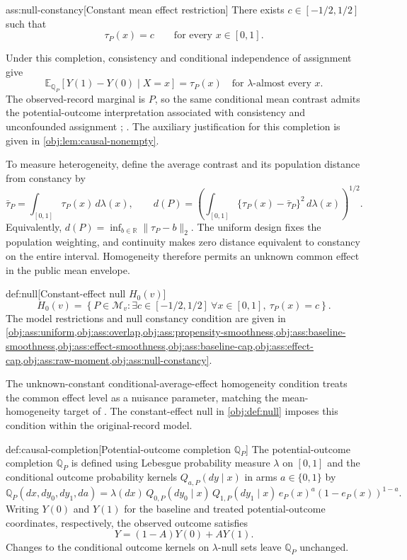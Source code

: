 \documentclass[11pt]{article}
\begin{document}
\begin{assumptionv}{ass:null-constancy}[Constant mean effect restriction]
There exists \(c\in[-1/2,1/2]\) such that
\[
\tau_P(x)=c
\qquad\text{for every }x\in[0,1].
\]
\end{assumptionv}

Under this completion, consistency and conditional independence of assignment give
\[
\mathbb E_{\mathbb Q_P}[Y(1)-Y(0)\mid X=x]=\tau_P(x)
\quad\text{for }\lambda\text{-almost every }x.
\]
The observed-record marginal is \(P\), so the same conditional mean contrast admits the potential-outcome interpretation associated with consistency and unconfounded assignment \citep[Section 3]{Rubin1974}; \citep[Section 2]{Rosenbaum1983}. The auxiliary justification for this completion is given in \cref{obj:lem:causal-nonempty}.

To measure heterogeneity, define the average contrast  and its population distance from constancy  by
\[
\bar\tau_P=\int_{[0,1]}\tau_P(x)\,d\lambda(x),
\qquad
d(P)
=
\left(
\int_{[0,1]}\{\tau_P(x)-\bar\tau_P\}^{2}\,d\lambda(x)
\right)^{1/2}.
\]
Equivalently, \(d(P)=\inf_{b\in\mathbb R}\|\tau_P-b\|_2\). The uniform design fixes the population weighting, and continuity makes zero distance equivalent to constancy on the entire interval. Homogeneity therefore permits an unknown common effect  in the public mean envelope.

\begin{definitionv}{def:null}[Constant-effect null $H_0(v)$]
\[
H_0(v)
=
\left\{
P\in\mathcal M_v:
\exists c\in[-1/2,1/2]\ 
\forall x\in[0,1],\ \tau_P(x)=c
\right\}.
\]
The model restrictions and null constancy condition are given in \cref{obj:ass:uniform,obj:ass:overlap,obj:ass:propensity-smoothness,obj:ass:baseline-smoothness,obj:ass:effect-smoothness,obj:ass:baseline-cap,obj:ass:effect-cap,obj:ass:raw-moment,obj:ass:null-constancy}.
\end{definitionv}

The unknown-constant conditional-average-effect homogeneity condition treats the common effect level as a nuisance parameter, matching the mean-homogeneity target of \citep{CrumpHotzImbensMitnik2008Homogeneity}. The constant-effect null  in \cref{obj:def:null} imposes this condition within the original-record model.

\begin{definitionv}{def:causal-completion}[Potential-outcome completion $\mathbb Q_P$]
The potential-outcome completion \(\mathbb Q_P\) is defined using Lebesgue probability measure \(\lambda\) on \([0,1]\) and the conditional outcome probability kernels \(Q_{a,P}(dy\mid x)\) in arms \(a\in\{0,1\}\) by
\[
\mathbb Q_P(dx,dy_0,dy_1,da)
=
\lambda(dx)\,Q_{0,P}(dy_0\mid x)\,Q_{1,P}(dy_1\mid x)\,
e_P(x)^a(1-e_P(x))^{1-a}.
\]
Writing \(Y(0)\) and \(Y(1)\) for the baseline and treated potential-outcome coordinates, respectively, the observed outcome satisfies
\[
Y=(1-A)Y(0)+AY(1).
\]
Changes to the conditional outcome kernels on \(\lambda\)-null sets leave \(\mathbb Q_P\) unchanged.
\end{definitionv}
\end{document}
